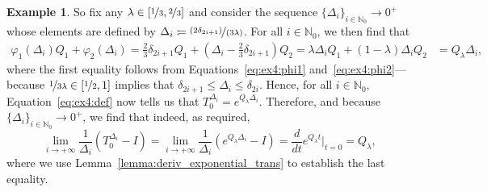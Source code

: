 \documentclass[10pt,a4paper]{paper}
\theoremstyle{definition}
\newtheorem{exmp}{Example}%
\newcommand{\nats}{\mathbb{N}}
\newcommand{\processes}{\mathbb{P}}
\newcommand{\wprocesses}{\processes^{\mathrm{W}}}
\newcommand{\coloneqq}{:\!=}
\begin{document}
\begin{exmp}
So fix any $\lambda\in[\nicefrac{1}{3},\nicefrac{2}{3}]$ and consider the sequence $\{\Delta_i\}_{i\in\nats_0}\to0^+$ whose elements are defined by $\Delta_i\coloneqq\nicefrac{(2\delta_{2i+1})}{(3\lambda)}$. For all $i\in\nats_0$, we then find that
\begin{align*}
\varphi_1(\Delta_i)Q_1+\varphi_2(\Delta_i)
=\frac{2}{3}\delta_{2i+1}Q_1+(\Delta_i-\frac{2}{3}\delta_{2i+1})Q_2
=\lambda\Delta_i Q_1+(1-\lambda)\Delta_i Q_2
&=Q_\lambda \Delta_i,
\end{align*}
where the first equality follows from Equations~\eqref{eq:ex4:phi1} and~\eqref{eq:ex4:phi2}---because $\nicefrac{1}{3\lambda}\in[\nicefrac{1}{2},1]$ implies that $\delta_{2i+1}\leq\Delta_i\leq\delta_{2i}$.
Hence, for all $i\in\nats_0$, Equation~\eqref{eq:ex4:def} now tells us that $T_0^{\Delta_i}=e^{Q_\lambda\Delta_i}$.
Therefore, and because $\{\Delta_{i}\}_{i\in\nats_0}\to0^+$, we find that indeed, as required,
\begin{equation}\label{eq:exmp:well-behaved-no-deriv2}
\lim_{i\to+\infty}
\frac{1}{\Delta_i}
(T^{\Delta_i}_{0}-I)
=
\lim_{i\to+\infty}
\frac{1}{\Delta_{i}}
(e^{Q_\lambda\Delta_{i}}-I)
={\frac{d}{dt}e^{Q_\lambda t}}\big\vert_{t=0}
=Q_\lambda,
\end{equation}
where we use Lemma~\ref{lemma:deriv_exponential_trans} to establish the last equality. 

\end{exmp}
\end{document}

